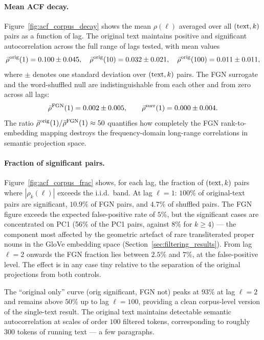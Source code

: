 \documentclass[preprint]{elsarticle}
\begin{document}
\paragraph{Mean ACF decay.}
Figure~\ref{fig:acf_corpus_decay} shows the mean $\rho(\ell)$ averaged
over all $({\rm text}, k)$ pairs as a function of lag.
The original text maintains positive and significant autocorrelation
across the full range of lags tested, with mean values
\begin{equation}
  \bar\rho^{\rm orig}(1) = 0.100 \pm 0.045,
  \quad
  \bar\rho^{\rm orig}(10) = 0.032 \pm 0.021,
  \quad
  \bar\rho^{\rm orig}(100) = 0.011 \pm 0.011,
  \label{eq:rho_orig_values}
\end{equation}
where $\pm$ denotes one standard deviation over $({\rm text}, k)$
pairs.
The FGN surrogate and the word-shuffled null are indistinguishable
from each other and from zero across all lags:
\begin{equation}
  \bar\rho^{\rm FGN}(1) = 0.002 \pm 0.005,
  \qquad
  \bar\rho^{\rm surr}(1) = 0.000 \pm 0.004.
  \label{eq:rho_null_values}
\end{equation}
The ratio $\bar\rho^{\rm orig}(1) / \bar\rho^{\rm FGN}(1) \approx 50$
quantifies how completely the FGN rank-to-embedding mapping destroys
the frequency-domain long-range correlations in semantic projection
space.

\paragraph{Fraction of significant pairs.}
Figure~\ref{fig:acf_corpus_frac} shows, for each lag, the fraction of
$({\rm text}, k)$ pairs where $|\rho_k(\ell)|$ exceeds the i.i.d.\
band.
At lag $\ell = 1$: $100\%$ of original-text pairs are significant,
$10.9\%$ of FGN pairs, and $4.7\%$ of shuffled pairs.
The FGN figure exceeds the expected false-positive rate
of $5\%$, but the significant cases are concentrated on PC1
(56\% of the PC1 pairs, against 8\% for $k \geq 4$) --- the component
most affected by the geometric artefact of rare transliterated proper
nouns in the GloVe embedding space (Section~\ref{sec:filtering_results}).
From lag $\ell = 2$ onwards the FGN fraction lies between $2.5\%$ and
$7\%$, at the false-positive level. The effect is in any case tiny
relative to the separation of the original projections from both
controls.

The ``original only'' curve (orig significant, FGN not) peaks at
$93\%$ at lag $\ell = 2$ and remains above $50\%$ up to lag
$\ell = 100$, providing a clean corpus-level version of the
single-text result.
The original text maintains detectable semantic autocorrelation
at scales of order $100$ filtered tokens, corresponding to roughly $300$ tokens 
of running text --- a few paragraphs.
\end{document}

